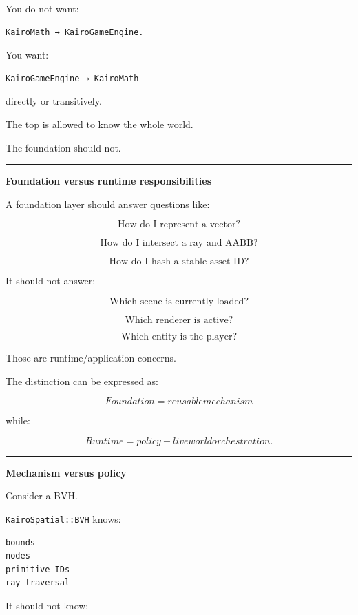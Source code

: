 You do not want:

\begin{verbatim}
KairoMath → KairoGameEngine.
\end{verbatim}

You want:

\begin{verbatim}
KairoGameEngine → KairoMath
\end{verbatim}

directly or transitively.

The top is allowed to know the whole world.

The foundation should not.

\begin{center}\rule{0.5\linewidth}{0.5pt}\end{center}

\textbf{Foundation versus runtime responsibilities}

A foundation layer should answer questions like:

\[
\text{How do I represent a vector?}
\]

\[
\text{How do I intersect a ray and AABB?}
\]

\[
\text{How do I hash a stable asset ID?}
\]

It should not answer:

\[
\text{Which scene is currently loaded?}
\]

\[
\text{Which renderer is active?}
\]

\[
\text{Which entity is the player?}
\]

Those are runtime/application concerns.

The distinction can be expressed as:

\[
\boxed{
Foundation = reusable mechanism
}
\]

while:

\[
\boxed{
Runtime = policy + live world orchestration.
}
\]

\begin{center}\rule{0.5\linewidth}{0.5pt}\end{center}

\textbf{Mechanism versus policy}

Consider a BVH.

\texttt{KairoSpatial::BVH} knows:

\begin{verbatim}
bounds
nodes
primitive IDs
ray traversal
\end{verbatim}

It should not know:


